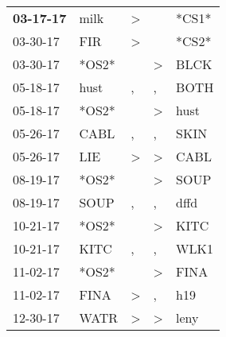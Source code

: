 \begin{supertabular}{p{0.07\textwidth}p{0.06\textwidth}p{0.02\textwidth}p{0.02\textwidth}p{0.06\textwidth}}
 \textbf{03-17-17\textsuperscript{}} &           milk\textsuperscript{} &     \textgreater &                  &                            *CS1* \\
          03-30-17\textsuperscript{} &            FIR\textsuperscript{} &     \textgreater &                  &                            *CS2* \\
          03-30-17\textsuperscript{} &                            *OS2* &                  &     \textgreater &           BLCK\textsuperscript{} \\
          05-18-17\textsuperscript{} &           hust\textsuperscript{} &                , &                , &           BOTH\textsuperscript{} \\
          05-18-17\textsuperscript{} &                            *OS2* &                  &     \textgreater &           hust\textsuperscript{} \\
          05-26-17\textsuperscript{} &           CABL\textsuperscript{} &                , &                , &           SKIN\textsuperscript{} \\
          05-26-17\textsuperscript{} &            LIE\textsuperscript{} &     \textgreater &     \textgreater &           CABL\textsuperscript{} \\
          08-19-17\textsuperscript{} &                            *OS2* &                  &     \textgreater &           SOUP\textsuperscript{} \\
          08-19-17\textsuperscript{} &           SOUP\textsuperscript{} &                , &                , &           dffd\textsuperscript{} \\
          10-21-17\textsuperscript{} &                            *OS2* &                  &     \textgreater &           KITC\textsuperscript{} \\
          10-21-17\textsuperscript{} &           KITC\textsuperscript{} &                , &                , &           WLK1\textsuperscript{} \\
          11-02-17\textsuperscript{} &                            *OS2* &                  &     \textgreater &           FINA\textsuperscript{} \\
          11-02-17\textsuperscript{} &           FINA\textsuperscript{} &     \textgreater &                , &            h19\textsuperscript{} \\
          12-30-17\textsuperscript{} &           WATR\textsuperscript{} &     \textgreater &     \textgreater &           leny\textsuperscript{} \\

\end{supertabular}
